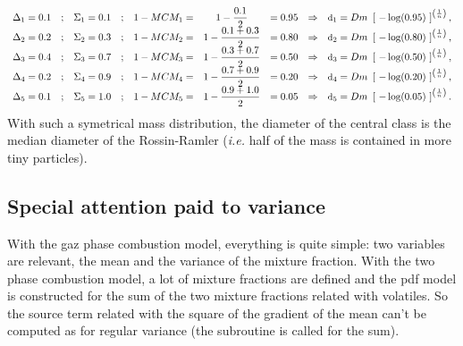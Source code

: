 \begin{equation*}
\begin{array}{r c l c l c l c l}
\Delta_{1} = 0.1 &;& \Sigma_{1} = 0.1 &;& 1-MCM_{1}= &1-\dfrac{0.1}{2}&=0.95 &\Rightarrow&
           \mbox{\small d}_1 = Dm ~ \left[~ -\log(0.95) ~\right]^{\left(\frac{1}{n}\right)}, \\
\Delta_{2} = 0.2 &;& \Sigma_{2} = 0.3 &;& 1-MCM_{2}= &1-\dfrac{0.1+0.3}{2}&= 0.80 &\Rightarrow&
           \mbox{\small d}_2 = Dm ~ \left[~ -\log(0.80) ~\right]^{\left(\frac{1}{n}\right)}, \\
\Delta_{3} = 0.4 &;& \Sigma_{3} = 0.7 &;& 1-MCM_{3}= &1-\dfrac{0.3+0.7}{2}&= 0.50 &\Rightarrow&
           \mbox{\small d}_3 = Dm ~ \left[~ -\log(0.50) ~\right]^{\left(\frac{1}{n}\right)}, \\
\Delta_{4} = 0.2 &;& \Sigma_{4} = 0.9 &;& 1-MCM_{4}= &1-\dfrac{0.7+0.9}{2}&= 0.20 &\Rightarrow&
           \mbox{\small d}_4 = Dm ~ \left[~ -\log(0.20) ~\right]^{\left( \frac{1}{n}\right)}, \\
\Delta_{5} = 0.1 &;& \Sigma_{5} = 1.0 &;& 1-MCM_{5}= &1-\dfrac{0.9+1.0}{2}&= 0.05 &\Rightarrow&
           \mbox{\small d}_5 = Dm ~ \left[~ -\log(0.05) ~\right]^{\left(\frac{1}{n}\right)} .
\end{array}
\end{equation*}
With such a symetrical mass distribution, the diameter of the central class is the median diameter of the Rossin-Ramler (\emph{i.e.} half of the mass is contained in more tiny particles).

\subsection{Special attention paid to variance}

With the gaz phase combustion model, everything is quite simple: two variables
are relevant, the mean and the variance of the mixture fraction. With the two
phase combustion model, a lot of mixture fractions are defined and the pdf model
is constructed for the sum of the two mixture fractions related with
volatiles. So the source term related with the square of the gradient of the
mean can't be computed as for regular variance (the  subroutine is
called for the sum).

